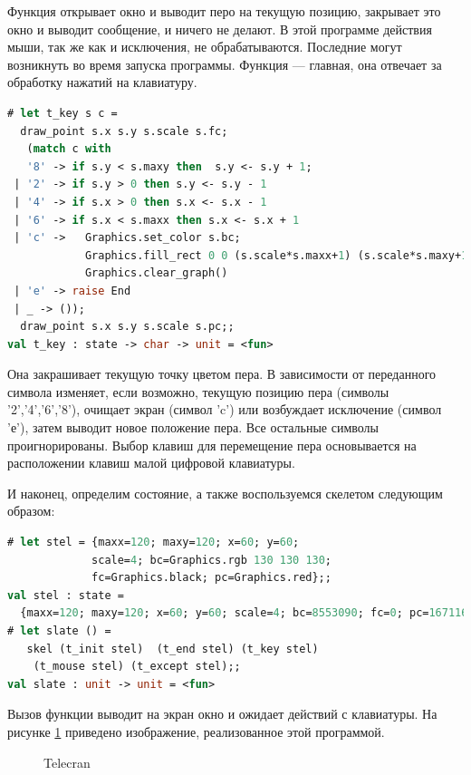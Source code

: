 Функция  открывает окно и выводит перо на текущую позицию, 
 закрывает это окно и выводит сообщение,  и 
 ничего не делают. В этой программе действия мыши, так же как и 
исключения, не обрабатываются. Последние могут возникнуть во время запуска 
программы. Функция  --- главная, она отвечает за обработку нажатий 
на клавиатуру.

\begin{lstlisting}[language=OCaml]
# let t_key s c = 
  draw_point s.x s.y s.scale s.fc;
   (match c with
   '8' -> if s.y < s.maxy then  s.y <- s.y + 1;  
 | '2' -> if s.y > 0 then s.y <- s.y - 1
 | '4' -> if s.x > 0 then s.x <- s.x - 1 
 | '6' -> if s.x < s.maxx then s.x <- s.x + 1 
 | 'c' ->   Graphics.set_color s.bc;
            Graphics.fill_rect 0 0 (s.scale*s.maxx+1) (s.scale*s.maxy+1); 
            Graphics.clear_graph()
 | 'e' -> raise End
 | _ -> ());
  draw_point s.x s.y s.scale s.pc;;
val t_key : state -> char -> unit = <fun>
\end{lstlisting}

Она закрашивает текущую точку цветом пера. В зависимости от переданного символа 
изменяет, если возможно, текущую позицию пера (символы '2','4','6','8'), очищает 
экран (символ 'c') или возбуждает исключение  (символ 'е'), затем 
выводит новое положение пера. Все остальные символы проигнорированы. Выбор 
клавиш для перемещение пера основывается на расположении клавиш малой цифровой 
клавиатуры.

И наконец, определим состояние, а также воспользуемся скелетом следующим 
образом:

\begin{lstlisting}[language=OCaml]
# let stel = {maxx=120; maxy=120; x=60; y=60; 
             scale=4; bc=Graphics.rgb 130 130 130;
             fc=Graphics.black; pc=Graphics.red};;
val stel : state =
  {maxx=120; maxy=120; x=60; y=60; scale=4; bc=8553090; fc=0; pc=16711680}
# let slate () = 
   skel (t_init stel)  (t_end stel) (t_key stel) 
    (t_mouse stel) (t_except stel);;
val slate : unit -> unit = <fun>
\end{lstlisting}

Вызов функции  выводит на экран окно и ожидает действий с 
клавиатуры. На рисунке \ref{fig:telecran} приведено изображение, реализованное 
этой программой.

\begin{figure}[h]
	\caption{\label{fig:telecran}Telecran}
\end{figure}
